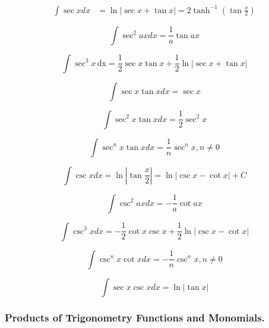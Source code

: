 \documentclass[../main.tex]{subfiles}
\begin{document}
    \begin{align*}
    \int \sec x dx &= \ln | \sec x + \tan x | = 2 \tanh^{-1} \left (\tan \frac{x}{2} \right) 
    \end{align*}
    
    \begin{equation*}
    \int \sec^2 ax dx = \frac{1}{a} \tan ax 
    \end{equation*}
    
    \begin{equation*}
    \int \sec^3 x \hspace{2pt}\text{dx} = \frac{1}{2} \sec x \tan x + \frac{1}{2}\ln | \sec x + \tan x |
    \end{equation*}
    
    \begin{equation*}
    \int \sec x \tan x dx = \sec x 
    \end{equation*}
    
    \begin{equation*}
    \int \sec^2 x \tan x dx = \frac{1}{2} \sec^2 x 
    \end{equation*}
    
    \begin{equation*}
    \int \sec^n x \tan x dx = \frac{1}{n} \sec^n x , n\ne 0
    \end{equation*}
    
    \begin{equation*}
    \int \csc x dx = \ln \left | \tan \frac{x}{2} \right|  = \ln | \csc x - \cot x| + C
    \end{equation*}
    
    \begin{equation*}
    \int \csc^2 ax dx = -\frac{1}{a} \cot ax 
    \end{equation*}
    
    \begin{equation*}
    \int \csc^3 x dx = -\frac{1}{2}\cot x \csc x + \frac{1}{2} \ln | \csc x - \cot x | 
    \end{equation*}
    
    \begin{equation*}
    \int \csc^nx \cot x dx = -\frac{1}{n}\csc^n x, n\ne 0
    \end{equation*}
    
    \begin{equation*}
    \int \sec x \csc x dx = \ln | \tan x | 
    \end{equation*}

\subsubsection*{Products of Trigonometry Functions and Monomials.}
    
\end{document}

